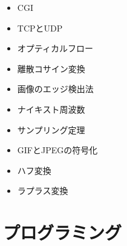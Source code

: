 \documentclass[a4j, titlepage, 11pt]{jsarticle}
\begin{document}
\begin{multicols}{2}
\begin{itemize}
	\item CGI
	\item TCPとUDP
	\item オプティカルフロー
	\item 離散コサイン変換
	\item 画像のエッジ検出法
	\item ナイキスト周波数
	\item サンプリング定理
	\item GIFとJPEGの符号化
	\item ハフ変換
	\item ラプラス変換
\end{itemize}
\end{multicols}

\section{プログラミング}
\end{document}
